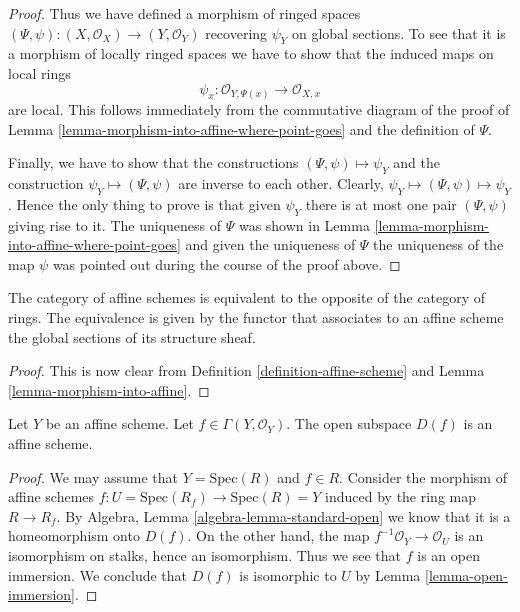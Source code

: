 \begin{proof}
\medskip\noindent
Thus we have defined a morphism of ringed spaces
$(\Psi, \psi) : (X, \mathcal{O}_X) \to (Y, \mathcal{O}_Y)$
recovering $\psi_Y$ on global sections. To see that it is
a morphism of locally ringed spaces we have to show that
the induced maps on local rings
$$
\psi_x : \mathcal{O}_{Y,\Psi(x)} \longrightarrow \mathcal{O}_{X, x}
$$
are local. This follows immediately from the commutative diagram
of the proof of Lemma \ref{lemma-morphism-into-affine-where-point-goes}
and the definition of $\Psi$.

\medskip\noindent
Finally, we have to show that the constructions
$(\Psi, \psi) \mapsto \psi_Y$ and the construction
$\psi_Y \mapsto (\Psi, \psi)$ are inverse to each other.
Clearly, $\psi_Y \mapsto (\Psi, \psi) \mapsto \psi_Y$.
Hence the only thing to prove is that given $\psi_Y$
there is at most one pair $(\Psi, \psi)$ giving rise
to it. The uniqueness of $\Psi$ was shown in Lemma
\ref{lemma-morphism-into-affine-where-point-goes} and
given the uniqueness of $\Psi$ the uniqueness of the
map $\psi$ was pointed out during the course of the proof
above.
\end{proof}

\begin{lemma}
\label{lemma-category-affine-schemes}
The category of affine schemes is equivalent to the opposite of the
category of rings. The equivalence is given by the functor that associates
to an affine scheme the global sections of its structure sheaf.
\end{lemma}

\begin{proof}
This is now clear from Definition \ref{definition-affine-scheme}
and Lemma \ref{lemma-morphism-into-affine}.
\end{proof}

\begin{lemma}
\label{lemma-standard-open-affine}
Let $Y$ be an affine scheme.
Let $f \in \Gamma(Y, \mathcal{O}_Y)$.
The open subspace $D(f)$ is an affine scheme.
\end{lemma}

\begin{proof}
We may assume that $Y = \text{Spec}(R)$ and $f \in R$.
Consider the morphism of affine schemes
$f : U = \text{Spec}(R_f) \to \text{Spec}(R) = Y$ induced by the ring
map $R \to R_f$. By Algebra, Lemma \ref{algebra-lemma-standard-open}
we know that it is a homeomorphism onto $D(f)$.
On the other hand, the map $f^{-1}\mathcal{O}_Y \to \mathcal{O}_U$
is an isomorphism on stalks, hence an isomorphism. Thus we see
that $f$ is an open immersion. We conclude that $D(f)$
is isomorphic to $U$ by Lemma \ref{lemma-open-immersion}.
\end{proof}

